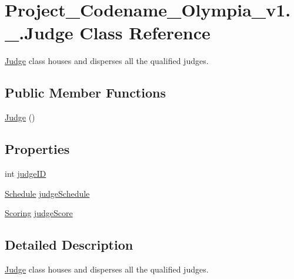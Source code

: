 \hypertarget{classProject__Codename__Olympia__v1_1_1__0_1_1Judge}{}\section{Project\+\_\+\+Codename\+\_\+\+Olympia\+\_\+v1.\+\_.\+Judge Class Reference}
\label{classProject__Codename__Olympia__v1_1_1__0_1_1Judge}


\hyperlink{classProject__Codename__Olympia__v1_1_1__0_1_1Judge}{Judge} class houses and disperses all the qualified judges.  


\subsection*{Public Member Functions}
\begin{DoxyCompactItemize}
\item 
\hyperlink{classProject__Codename__Olympia__v1_1_1__0_1_1Judge_a9960078c62261a1ed3b91297fcd8ef92}{Judge} ()
\end{DoxyCompactItemize}
\subsection*{Properties}
\begin{DoxyCompactItemize}
\item 
int \hyperlink{classProject__Codename__Olympia__v1_1_1__0_1_1Judge_a7cdcda330f37b5615e86a6988a7f4738}{judge\+ID}
\item 
\hyperlink{classProject__Codename__Olympia__v1_1_1__0_1_1Schedule}{Schedule} \hyperlink{classProject__Codename__Olympia__v1_1_1__0_1_1Judge_abc5270ee3b5cee8413bba169b17d899a}{judge\+Schedule}
\item 
\hyperlink{classProject__Codename__Olympia__v1_1_1__0_1_1Scoring}{Scoring} \hyperlink{classProject__Codename__Olympia__v1_1_1__0_1_1Judge_a5a378d0788d1077151cd42d122aee0bc}{judge\+Score}
\end{DoxyCompactItemize}


\subsection{Detailed Description}
\hyperlink{classProject__Codename__Olympia__v1_1_1__0_1_1Judge}{Judge} class houses and disperses all the qualified judges. 

